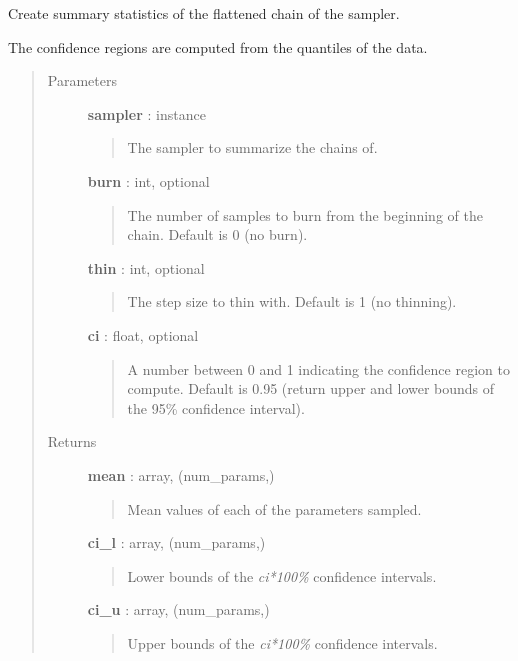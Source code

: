 \documentclass[letterpaper,10pt,english]{sphinxmanual}
\begin{document}
\begin{fulllineitems}
\label{gptools:gptools.utils.summarize_sampler}
Create summary statistics of the flattened chain of the sampler.

The confidence regions are computed from the quantiles of the data.
\begin{quote}\begin{description}
\item[{Parameters}] \leavevmode
\textbf{sampler} :  instance
\begin{quote}

The sampler to summarize the chains of.
\end{quote}

\textbf{burn} : int, optional
\begin{quote}

The number of samples to burn from the beginning of the chain. Default
is 0 (no burn).
\end{quote}

\textbf{thin} : int, optional
\begin{quote}

The step size to thin with. Default is 1 (no thinning).
\end{quote}

\textbf{ci} : float, optional
\begin{quote}

A number between 0 and 1 indicating the confidence region to compute.
Default is 0.95 (return upper and lower bounds of the 95\% confidence
interval).
\end{quote}

\item[{Returns}] \leavevmode
\textbf{mean} : array, (num\_params,)
\begin{quote}

Mean values of each of the parameters sampled.
\end{quote}

\textbf{ci\_l} : array, (num\_params,)
\begin{quote}

Lower bounds of the \emph{ci*100\%} confidence intervals.
\end{quote}

\textbf{ci\_u} : array, (num\_params,)
\begin{quote}

Upper bounds of the \emph{ci*100\%} confidence intervals.
\end{quote}

\end{description}\end{quote}

\end{fulllineitems}
\end{document}
